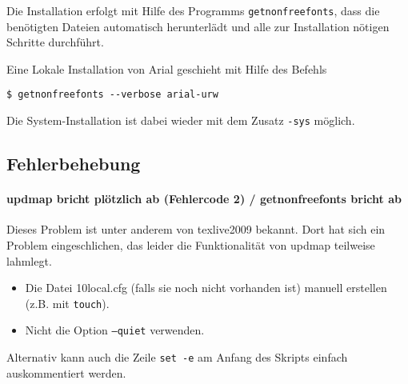 \begin{description}
    Die Installation erfolgt mit Hilfe des Programms \lstinline{getnonfreefonts},
    dass die benötigten Dateien automatisch herunterlädt und alle zur Installation
    nötigen Schritte durchführt.
    
    Eine Lokale Installation von Arial geschieht mit Hilfe des Befehls
    \begin{lstlisting}
$ getnonfreefonts --verbose arial-urw
    \end{lstlisting}
    
    Die System-Installation ist dabei wieder mit dem Zusatz \lstinline{-sys}
    möglich.



\end{description}


\newenvironment{knownissue}[1]{%
  \paragraph{#1}\hfill
  \newcommand{\solution}[1]{\noindent{\itshape ##1}}
}{%
}

\subsection{Fehlerbehebung}


\begin{knownissue}{%
  updmap bricht plötzlich ab (Fehlercode 2) / getnonfreefonts bricht ab
}

Dieses Problem ist unter anderem von texlive2009 bekannt.
Dort hat sich ein Problem eingeschlichen, das leider die Funktionalität von
updmap teilweise lahmlegt.

\solution{Mögliche Lösung:}
\begin{itemize}
  \item Die Datei 10local.cfg (falls sie noch nicht vorhanden ist) manuell
    erstellen (z.B. mit \texttt{touch}).
  \item Nicht die Option \texttt{--quiet} verwenden.
\end{itemize}

Alternativ kann auch die Zeile \lstinline{set -e} am Anfang des Skripts einfach auskommentiert werden.
\end{knownissue}


